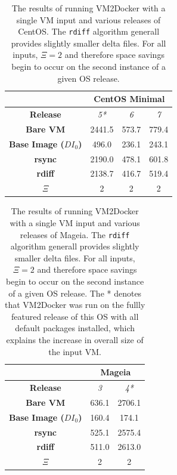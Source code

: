 \begin{table}[h]
\centering
    \begin{tabular}{| c | c | c | c |}
    \hline
& \multicolumn{3}{|c|}{\bfseries CentOS Minimal} \\ \hline
    \bfseries Release & \itshape 5* & \itshape 6 & \itshape 7 \\ \hline
    \bfseries Bare VM & 2441.5 &  573.7 & 779.4\\ \hline
    \bfseries Base Image ($DI_0$) & 496.0 & 236.1 & 243.1\\ \hline
    \bfseries rsync & 2190.0 & 478.1 & 601.8\\ \hline 
    \bfseries rdiff & 2138.7 & 416.7 & 519.4\\ \hline
\bfseries $\Xi$ & 2 & 2 & 2 \\ \hline
    \end{tabular}
\caption{The results of running VM2Docker with a single VM input and various releases of CentOS. The \texttt{rdiff} algorithm generall provides slightly smaller delta files. For all inputs, $\Xi = 2$ and therefore space savings begin to occur on the second instance of a given OS release.}
\label{table:diff2}
\end{table}

\begin{table}[h]
\centering
    \begin{tabular}{| c | c | c |}
    \hline
& \multicolumn{2}{|c|}{\bfseries Mageia} \\ \hline
    \bfseries Release & \itshape 3 & \itshape 4*  \\ \hline
    \bfseries Bare VM & 636.1 & 2706.1 \\ \hline
    \bfseries Base Image ($DI_0$) & 160.4 & 174.1\\ \hline
    \bfseries rsync & 525.1 & 2575.4\\ \hline 
    \bfseries rdiff & 511.0 & 2613.0\\ \hline 
\bfseries $\Xi$ & 2 & 2  \\ \hline
    \end{tabular}
\caption{The results of running VM2Docker with a single VM input and various releases of Mageia. The \texttt{rdiff} algorithm generall provides slightly smaller delta files. For all inputs, $\Xi = 2$ and therefore space savings begin to occur on the second instance of a given OS release. The * denotes that VM2Docker was run on the fullly featured release of this OS with all default packages installed, which explains the increase in overall size of the input VM.}
\label{table:diff3}
\end{table}

